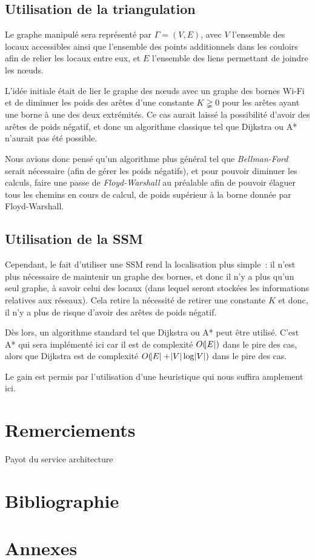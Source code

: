 \documentclass[11pt,a4paper]{article}
\begin{document}
	\subsection{Utilisation de la triangulation}
		Le graphe manipulé sera représenté par $\Gamma = (V, E)$, avec $V$ l'ensemble des locaux accessibles ainsi que l'ensemble des points additionnels dans les couloirs
		afin de relier les locaux entre eux, et $E$ l'ensemble des liens permettant de joindre les nœuds.

		L'idée initiale était de lier le graphe des nœuds avec un graphe des bornes Wi-Fi et de diminuer les poids des arêtes d'une constante $K \gneqq 0$ pour les arêtes
		ayant une borne à une des deux extrémités. Ce cas aurait laissé la possibilité d'avoir des arêtes de poids négatif, et donc un algorithme classique tel que Dijkstra
		ou A* n'aurait pas été possible.

		Nous avions donc pensé qu'un algorithme plus général tel que \textit{Bellman-Ford} serait nécessaire (afin de gérer les poids négatifs), et pour pouvoir diminuer
		les calculs, faire une passe de \textit{Floyd-Warshall} au préalable afin de pouvoir élaguer tous les chemins en cours de calcul, de poids supérieur à la borne
		donnée par Floyd-Warshall.

	\subsection{Utilisation de la SSM}
		Cependant, le fait d'utiliser une SSM rend la localisation plus simple~: il n'est plus nécessaire de maintenir un graphe des bornes, et donc il n'y a plus
		qu'un seul graphe, à savoir celui des locaux (dans lequel seront stockées les informations relatives aux réseaux). Cela retire la nécessité de retirer une
		constante $K$ et donc, il n'y a plus de risque d'avoir des arêtes de poids négatif.

		Dès lors, un algorithme standard tel que Dijkstra ou A* peut être utilisé. C'est A* qui sera implémenté ici car il est de complexité $O(\abs E)$ dans
		le pire des cas, alors que Dijkstra est de complexité $O(\abs E + \abs V\log\abs V)$ dans le pire des cas.

		Le gain est permis par l'utilisation d'une heuristique qui nous suffira amplement ici.

\section{Remerciements}
  Payot du service architecture

\section{Bibliographie}

\section{Annexes}
\end{document}
